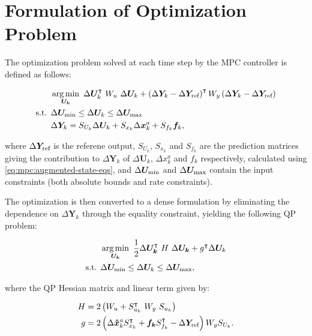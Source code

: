 \section{Formulation of Optimization Problem}
\label{sec:mpc:optimization}

The optimization problem solved at each time step by the MPC controller is defined as follows:

\begin{equation}
  \begin{split}
    & \operatorname*{arg\,min}_{\bm{U_k}}\ \Delta \bm{U}_k^\intercal\ W_u\ \Delta \bm{U}_k + \left( \Delta\bm{Y}_k - \Delta\bm{Y}_\text{ref} \right)^\intercal W_y \left( \Delta\bm{Y}_k - \Delta\bm{Y}_\text{ref} \right)\\
    \text{s.t. } & \Delta \bm{U}_\text{min} \leq \Delta \bm{U}_k \leq \Delta \bm{U}_\text{max}\\
    & \Delta \bm{Y}_k = S_{U_k} \Delta \bm{U}_k + S_{x_k} \Delta \bm{x}_k^a + S_{f_k} \bm{f}_k,
  \end{split}
\end{equation}
    
\noindent where $\Delta \bm{Y}_\text{ref}$ is the referene output, $S_{U_k}$, $S_{x_k}$ and $S_{f_k}$ are the prediction matrices giving the contribution to $\Delta \bm{Y}_k$ of $\Delta \bm{U}_k$, $\Delta x_k^a$ and $f_k$ respectively, calculated using \eqref{eq:mpc:augmented-state-eqs}, and $\Delta \bm{U}_\text{min}$ and $\Delta \bm{U}_\text{max}$ contain the input constraints (both absolute bounds and rate constraints).

The optimization is then converted to a dense formulation by eliminating the dependence on $\Delta \bm{Y}_k$ through the equality constraint, yielding the following QP problem:

\begin{equation}
  \begin{split}
    & \argmin_{\bm{U_k}}\ \frac{1}{2} \Delta\bm{U_k}^\intercal\ H\ \Delta\bm{U_k} + g^\intercal \Delta \bm{U}_k\\
    \text{s.t. } & \Delta \bm{U}\ut{min} \leq \Delta \bm{U}_k \leq \Delta \bm{U}\ut{max},
  \end{split}
  \label{eq:mpc:optimization-qp-formulation}
\end{equation}

\noindent where the QP Hessian matrix and linear term given by:

\begin{equation}
  \begin{split}
    H & = 2\left( W_u + S_{u_k}^\intercal\ W_y\ S_{u_k} \right)\\
    g & = 2\left( \Delta\bm{\hat{x}}_k^a S_{x_k}^\intercal + \bm{f_k} S_{f_k}^\intercal - \Delta \bm{Y}_\text{ref} \right)W_y S_{U_k}.
  \end{split}
  \label{eq:mpc:optimization-qp-terms}
\end{equation}

